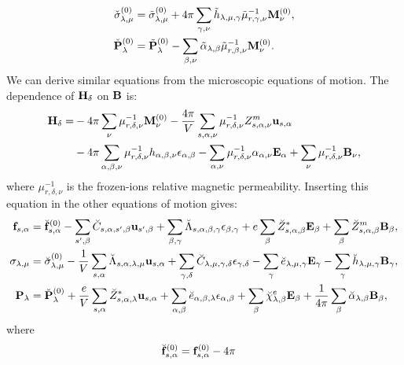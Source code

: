 \documentclass[12pt,a4paper,twoside]{report}
\begin{document}
{\begin{align}
\check \sigma^{(0)}_{\lambda,\mu} &= \tilde \sigma^{(0)}_{\lambda,\mu}
+ 4 \pi \sum_{\gamma,\nu} \tilde h_{\lambda,\mu,\gamma} 
\tilde \mu^{-1}_{r,\gamma,\nu} {\bf M}^{(0)}_\nu,  \\
\check {\bf P}^{(0)}_{\lambda} &= \tilde {\bf P}^{(0)}_{\lambda}
- \sum_{\beta,\nu} \tilde \alpha_{\lambda,\beta} 
\tilde \mu^{-1}_{r,\beta,\nu} {\bf M}^{(0)}_\nu. 
\end{align}
We can derive similar equations from the microscopic equations of motion.
The dependence of ${\bf H}_\delta$ on ${\bf B}$ is:
\begin{align}
{\bf H}_\delta = 
&- 4 \pi \sum_\nu \mu^{-1}_{r,\delta,\nu} {\bf M}^{(0)}_\nu 
-{4 \pi \over V} \sum_{s,\alpha,\nu} \mu^{-1}_{r,\delta,\nu} Z^m_{s,\alpha,\nu}
{\bf u}_{s,\alpha} \nonumber\\
&- 4 \pi \sum_{\alpha,\beta,\nu} \mu^{-1}_{r,\delta,\nu} h_{\alpha,\beta,\nu}
\epsilon_{\alpha,\beta} - \sum_{\alpha,\nu}
\mu^{-1}_{r,\delta,\nu} \alpha_{\alpha,\nu} {\bf E}_\alpha
+ \sum_\nu \mu^{-1}_{r,\delta,\nu} {\bf B}_\nu, 
\end{align}
where $\mu^{-1}_{r,\delta,\nu}$ is the frozen-ions relative magnetic
permeability.
Inserting this equation in the other equations of motion gives:
\begin{align}
{\bf f}_{s,\alpha}&= \breve{\bf f}^{(0)}_{s,\alpha}
-\sum_{s',\beta} \breve C_{s,\alpha,s',\beta} {\bf u}_{s',\beta}
+\sum_{\beta,\gamma}
\breve \Lambda_{s,\alpha,\beta,\gamma} 
\epsilon_{\beta,\gamma} +
e \sum_{\beta} \breve Z^*_{s,\alpha,\beta} {\bf E}_{\beta}
+\sum_{\beta} 
\breve Z^m_{s,\alpha,\beta} {\bf B}_{\beta}, \\
\sigma_{\lambda,\mu}&= \breve  \sigma_{\lambda,\mu}^{(0)}
-{1\over V} \sum_{s,\alpha}
\breve \Lambda_{s,\alpha,\lambda,\mu} {\bf u}_{s,\alpha}
+\sum_{\gamma,\delta} \breve C_{\lambda,\mu,\gamma,\delta}  
\epsilon_{\gamma,\delta} -
\sum_{\gamma} \breve e_{\lambda,\mu,\gamma} 
 {\bf E}_{\gamma}
-\sum_{\gamma}  \breve h_{\lambda,\mu,\gamma} 
{\bf B}_{\gamma}, \\
{\bf P}_{\lambda}&= \breve {\bf P}^{(0)}_{\lambda}
+{e\over V} \sum_{s,\alpha} \breve Z^*_{s,\alpha,\lambda} 
{\bf u}_{s,\alpha} +
\sum_{\alpha,\beta} \breve e_{\alpha,\beta,\lambda} 
\epsilon_{\alpha,\beta} +
\sum_{\beta} 
\breve \chi^e_{\lambda,\beta}
{\bf E}_{\beta} +
{1\over 4 \pi} \sum_{\beta} \breve \alpha_{\lambda,\beta} 
{\bf B}_{\beta}, 
\end{align}
where
\begin{align}
\breve {\bf f}^{(0)}_{s,\alpha}&= {\bf f}^{(0)}_{s,\alpha} - 4 \pi

\end{align}}
\end{document}

